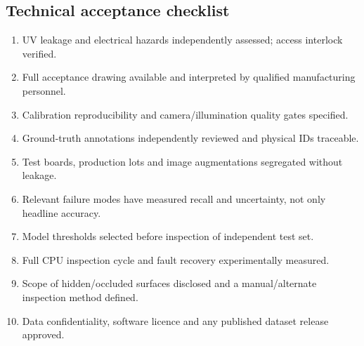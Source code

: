 \subsection{Technical acceptance checklist}
\begin{enumerate}[leftmargin=*]
\item UV leakage and electrical hazards independently assessed; access interlock verified.
\item Full acceptance drawing available and interpreted by qualified manufacturing personnel.
\item Calibration reproducibility and camera/illumination quality gates specified.
\item Ground-truth annotations independently reviewed and physical IDs traceable.
\item Test boards, production lots and image augmentations segregated without leakage.
\item Relevant failure modes have measured recall and uncertainty, not only headline accuracy.
\item Model thresholds selected before inspection of independent test set.
\item Full CPU inspection cycle and fault recovery experimentally measured.
\item Scope of hidden/occluded surfaces disclosed and a manual/alternate inspection method defined.
\item Data confidentiality, software licence and any published dataset release approved.
\end{enumerate}

